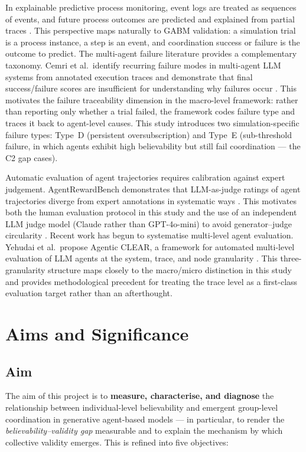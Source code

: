 \documentclass[11pt]{article}
\begin{document}
In explainable predictive process monitoring, event logs are treated as sequences of events,
and future process outcomes are predicted and explained from partial traces
\cite{galanti2020explainable}. This perspective maps naturally to GABM validation: a
simulation trial is a process instance, a step is an event, and coordination success or
failure is the outcome to predict. The multi-agent failure literature provides a complementary
taxonomy. Cemri et al.\ identify recurring failure modes in multi-agent LLM systems from
annotated execution traces and demonstrate that final success/failure scores are insufficient
for understanding why failures occur \cite{cemri2025fails}. This motivates the failure
traceability dimension in the macro-level framework: rather than reporting only whether a
trial failed, the framework codes failure type and traces it back to agent-level causes.
This study introduces two simulation-specific failure types: Type~D (persistent
oversubscription) and Type~E (sub-threshold failure, in which agents exhibit high
believability but still fail coordination --- the C2 gap cases).

Automatic evaluation of agent trajectories requires calibration against expert judgement.
AgentRewardBench demonstrates that LLM-as-judge ratings of agent trajectories diverge from
expert annotations in systematic ways \cite{pan2025agentrewardbench}. This motivates both
the human evaluation protocol in this study and the use of an independent LLM judge model
(Claude rather than GPT-4o-mini) to avoid generator--judge circularity \cite{zheng2023judging}.
Recent work has begun to systematise multi-level agent evaluation. Yehudai et al.\ propose
Agentic CLEAR, a framework for automated multi-level evaluation of LLM agents at the
system, trace, and node granularity \cite{yehudai2026clear}. This three-granularity
structure maps closely to the macro/micro distinction in this study and provides methodological
precedent for treating the trace level as a first-class evaluation target rather than an afterthought.

\section{Aims and Significance}

\subsection{Aim}
The aim of this project is to \textbf{measure, characterise, and diagnose} the relationship between individual-level believability and emergent group-level coordination in generative agent-based models --- in particular, to render the \emph{believability--validity gap} measurable and to explain the mechanism by which collective validity emerges. This is refined into five objectives:
\end{document}
